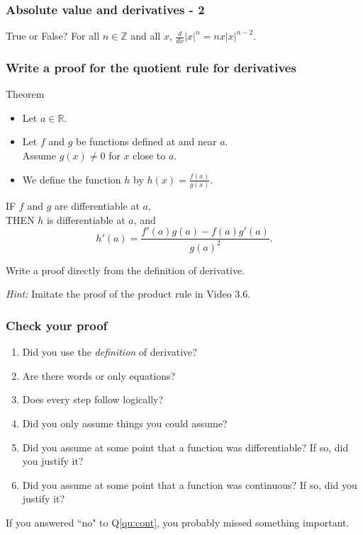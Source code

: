 \documentclass[14pt]{beamer}
\begin{document}
\begin{frame}[t]
	\frametitle{Absolute value and derivatives - 2}

	\begin{block}{True or False?}
		For all $n \in \mathbb{Z}$ and all $x$, $\frac{d}{dx}|x|^{n}=nx|x|^{n-2}$.
	\end{block}
\end{frame}

\begin{frame}[t]
	\fontsize{13}{13}\selectfont
	\frametitle{Write a proof for the quotient rule for derivatives}

	\begin{block}{Theorem}
		\begin{itemize}
			\item Let $a \in \mathbb{R}$.

			\item Let $f$ and $g$ be functions defined at and near $a$. \\ Assume
				$g(x) \neq 0$ for $x$ close to $a$.

			\item We define the function $h$ by $\displaystyle h(x) = \frac{f(x)}{g(x)}$.
		\end{itemize}

		IF $f$ and $g$ are differentiable at $a$, \\ THEN $h$ is differentiable at $a$,
		and
		\[
			h'(a) = \frac{f'(a) g(a) - f(a) g'(a)}{g(a)^{2}}.
		\]
	\end{block}

	\vfill

	Write a proof directly from the definition of derivative.

	\emph{Hint:} Imitate the proof of the product rule in Video 3.6.
\end{frame}

\begin{frame}[t]
	\frametitle{Check your proof}

	\begin{enumerate}
		\item Did you use the \emph{definition} of derivative?

		\item Are there words or only equations?

		\item Does every step follow logically?

		\item Did you only assume things you could assume?

		\item Did you assume at some point that a function was differentiable? If so,
			did you justify it?

		\item \label{qu:cont} Did you assume at some point that a function was continuous?
			If so, did you justify it?
	\end{enumerate}

	If you answered ``no" to Q\ref{qu:cont}, you probably missed something
	important.
\end{frame}
\end{document}
